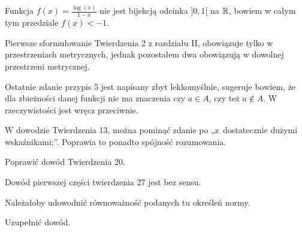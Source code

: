 \documentclass[a4paper,11pt]{article}
\begin{document}
\vspace{\spaceFour}


\start {} Funkcja $f( x ) = \frac{ \log( x ) }{ 1 - x }$ nie jest
bijekcją odcinka $] 0, 1 [$ na $\mathbb{R}$, bowiem w całym tym przedziale
$f( x ) < -1$.

\vspace{\spaceFour}


\start {} Pierwsze sformułowanie Twierdzenia 2 z rozdziału II,
obowiązuje tylko w przestrzeniach metrycznych, jednak pozostałem dwa
obowiązują w dowolnej przestrzeni metrycznej.

\vspace{\spaceFour}


\start {} Ostatnie zdanie przypis 5 jest napisany zbyt
lekkomyślnie, sugeruje bowiem, że dla zbieżności danej funkcji nie ma
znaczenia czy $a \in A$, czy też $a \notin A$. W rzeczywistości jest wręcz
przeciwnie.

\vspace{\spaceFour}


\start {} W dowodzie Twierdzenia 13, można pominąć zdanie po
„z~dostatecznie dużymi wskaźnikami;”. Poprawia to ponadto spójność
rozumowania.

\vspace{\spaceFour}


\start {} Poprawić dowód Twierdzenia 20. 

\vspace{\spaceFour}


\start {} Dowód pierwszej części twierdzenia 27 jest bez sensu.

\vspace{\spaceFour}


\start {} Należałoby udowodnić równoważność podanych tu określeń
normy.

\vspace{\spaceFour}


\start {} Uzupełnić dowód.

\vspace{\spaceFour}
\end{document}
